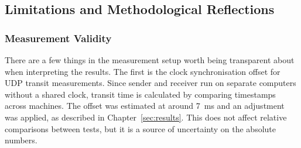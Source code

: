 \subsection{Limitations and Methodological Reflections}\label{subsec:disc_limitations}

\subsubsection{Measurement Validity}\label{subsubsec:meas_validity}

There are a few things in the measurement setup worth being transparent about when interpreting the results. The first is the clock synchronisation offset for UDP transit measurements. Since sender and receiver run on separate computers without a shared clock, transit time is calculated by comparing timestamps across machines. The offset was estimated at around 7~ms and an adjustment was applied, as described in Chapter~\ref{sec:results}. This does not affect relative comparisons between tests, but it is a source of uncertainty on the absolute numbers.
 
